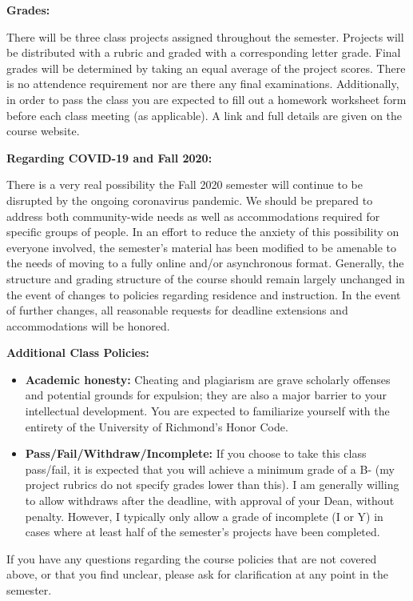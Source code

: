 \documentclass[12pt, a4paper]{article}
\begin{document}
\textbf{Grades:} \vspace{6pt}

There will be three class projects assigned throughout the semester. Projects will be
distributed with a rubric and graded with a corresponding letter grade. Final grades will
be determined by taking an equal average of the project scores. There is no attendence
requirement nor are there any final examinations. Additionally, in order to pass the class
you are expected to fill out a homework worksheet form before each class meeting
(as applicable). A link and full details are given on the course website.

\bigskip

\textbf{Regarding COVID-19 and Fall 2020:} \vspace{6pt}

There is a very real possibility the Fall 2020 semester will continue to be disrupted by
the ongoing coronavirus pandemic. We should be prepared to address both community-wide
needs as well as accommodations required for specific groups of people. In an effort to
reduce the anxiety of this possibility on everyone involved, the semester's material has
been modified to be amenable to the needs of moving to a fully online and/or asynchronous
format. Generally, the structure and grading structure of the course should remain largely
unchanged in the event of changes to policies regarding residence and instruction. In the
event of further changes, all reasonable requests for deadline extensions and
accommodations will be honored.

\bigskip

\textbf{Additional Class Policies:} \vspace{6pt}

\begin{itemize}\setlength\itemsep{0em}
\item \textbf{Academic honesty:}
Cheating and plagiarism are grave scholarly offenses and potential grounds
for expulsion; they are also a major barrier to your intellectual development.
You are expected to familiarize yourself with the entirety of the
University of Richmond’s Honor Code.
\item \textbf{Pass/Fail/Withdraw/Incomplete:} If you choose to take this
class pass/fail, it is expected that you will achieve a minimum grade of a B- (my project
rubrics do not specify grades lower than this). I am generally willing to allow withdraws
after the deadline, with approval of your Dean, without penalty. However, I typically only
allow a grade of incomplete (I or Y) in cases where at least half of the semester's projects
have been completed.
\end{itemize}

If you have any questions regarding the course policies that are not covered above, or
that you find unclear, please ask for clarification at any point in the semester.
\end{document}
